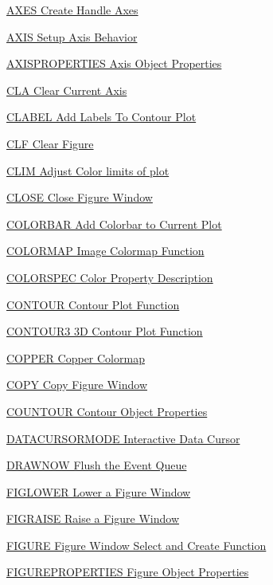 
\begin{DoxyItemize}
\item \hyperlink{handle_axes}{A\-X\-E\-S Create Handle Axes}  
\item \hyperlink{handle_axis}{A\-X\-I\-S Setup Axis Behavior}  
\item \hyperlink{handle_axisproperties}{A\-X\-I\-S\-P\-R\-O\-P\-E\-R\-T\-I\-E\-S Axis Object Properties}  
\item \hyperlink{handle_cla}{C\-L\-A Clear Current Axis}  
\item \hyperlink{handle_clabel}{C\-L\-A\-B\-E\-L Add Labels To Contour Plot}  
\item \hyperlink{handle_clf}{C\-L\-F Clear Figure}  
\item \hyperlink{handle_clim}{C\-L\-I\-M Adjust Color limits of plot}  
\item \hyperlink{handle_close}{C\-L\-O\-S\-E Close Figure Window}  
\item \hyperlink{handle_colorbar}{C\-O\-L\-O\-R\-B\-A\-R Add Colorbar to Current Plot}  
\item \hyperlink{handle_colormap}{C\-O\-L\-O\-R\-M\-A\-P Image Colormap Function}  
\item \hyperlink{handle_colorspec}{C\-O\-L\-O\-R\-S\-P\-E\-C Color Property Description}  
\item \hyperlink{handle_contour}{C\-O\-N\-T\-O\-U\-R Contour Plot Function}  
\item \hyperlink{handle_contour3}{C\-O\-N\-T\-O\-U\-R3 3\-D Contour Plot Function}  
\item \hyperlink{handle_copper}{C\-O\-P\-P\-E\-R Copper Colormap}  
\item \hyperlink{handle_copy}{C\-O\-P\-Y Copy Figure Window}  
\item \hyperlink{handle_countour}{C\-O\-U\-N\-T\-O\-U\-R Contour Object Properties}  
\item \hyperlink{handle_datacursormode}{D\-A\-T\-A\-C\-U\-R\-S\-O\-R\-M\-O\-D\-E Interactive Data Cursor}  
\item \hyperlink{handle_drawnow}{D\-R\-A\-W\-N\-O\-W Flush the Event Queue}  
\item \hyperlink{handle_figlower}{F\-I\-G\-L\-O\-W\-E\-R Lower a Figure Window}  
\item \hyperlink{handle_figraise}{F\-I\-G\-R\-A\-I\-S\-E Raise a Figure Window}  
\item \hyperlink{handle_figure}{F\-I\-G\-U\-R\-E Figure Window Select and Create Function}  
\item \hyperlink{handle_figureproperties}{F\-I\-G\-U\-R\-E\-P\-R\-O\-P\-E\-R\-T\-I\-E\-S Figure Object Properties}  

\end{DoxyItemize}
